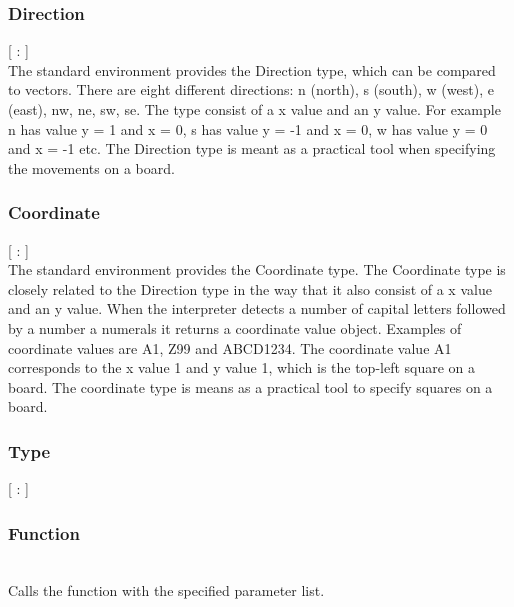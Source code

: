 \subsubsection{Direction}
\begin{dlist}
  \item {}[ : ]\\
  The standard environment provides the Direction type, which can be compared to vectors. There are eight different directions: n (north), s (south), w (west), e (east), nw, ne, sw, se. The type consist of a x value and an y value. For example n has value y = 1 and x = 0, s has value y = -1 and x = 0, w has value y = 0 and x = -1 etc. The Direction type is meant as a practical tool when specifying the movements on a board.  
\end{dlist}

\subsubsection{Coordinate}
\begin{dlist}
  \item {}[ : ]\\
  The standard environment provides the Coordinate type. The Coordinate type is closely related to the Direction type in the way that it also consist of a x value and an y value. When the interpreter detects a number of capital letters followed by a number a numerals it returns a coordinate value object. Examples of coordinate values are A1, Z99 and ABCD1234. The coordinate value A1 corresponds to the x value 1 and y value 1, which is the top-left square on a board. The coordinate type is means as a practical tool to specify squares on a board.  
\end{dlist}
\subsubsection{Type}
\begin{dlist}
  \item {}[ : ]\\
\end{dlist}
\subsubsection{Function}

\begin{dlist}
  \item {}\\
    Calls the function with the specified parameter list. 
\end{dlist}

